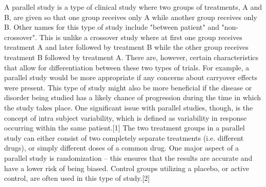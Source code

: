 A parallel study is a type of clinical study where two groups of treatments, A and B, are given so that one group receives only A while another group receives only B. Other names for this type of study include "between patient" and "non-crossover". This is unlike a crossover study where at first one group receives treatment A and later followed by treatment B while the other group receives treatment B followed by treatment A. There are, however, certain characteristics that allow for differentiation between these two types of trials. For example, a parallel study would be more appropriate if any concerns about carryover effects were present. This type of study might also be more beneficial if the disease or disorder being studied has a likely chance of progression during the time in which the study takes place. One significant issue with parallel studies, though, is the concept of intra subject variability, which is defined as variability in response occurring within the same patient.[1]
The two treatment groups in a parallel study can either consist of two completely separate treatments (i.e. different drugs), or simply different doses of a common drug. One major aspect of a parallel study is randomization – this ensures that the results are accurate and have a lower risk of being biased. Control groups utilizing a placebo, or active control, are often used in this type of study.[2]
